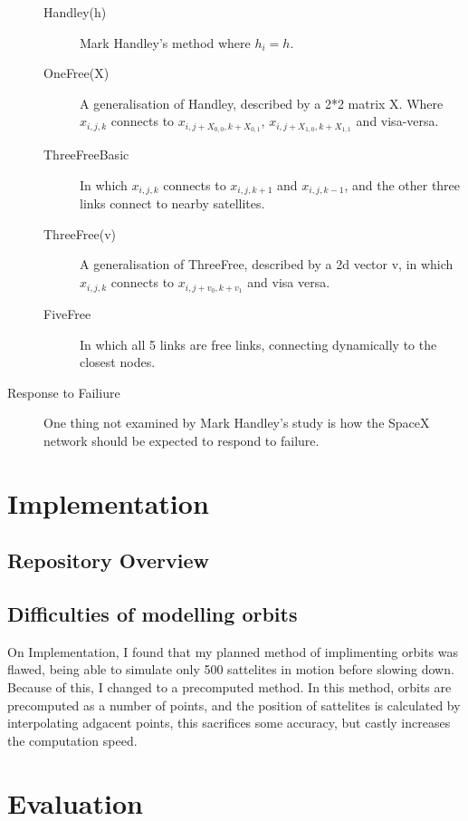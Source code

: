 \documentclass[12pt]{article}
\begin{document}
\begin{description}
\begin{description}
\item[Handley(h)] Mark Handley's method where $h_i = h$.
\item[OneFree(X)] A generalisation of Handley, described by a 2*2 matrix X. Where $x_{i,j,k}$ connects to $x_{i,j+X_{0,0},k+X_{0,1}}$, $x_{i,j+X_{1,0},k+X_{1,1}}$ and visa-versa.
\item[ThreeFreeBasic] In which $x_{i,j,k}$ connects to $x_{i,j,k+1}$ and $x_{i,j,k-1}$, and the other three links connect to nearby satellites.
\item[ThreeFree(v)] A generalisation of ThreeFree, described by a 2d vector v, in which $x_{i,j,k}$ connects to $x_{i,j+v_0,k+v_1}$ and visa versa.
\item[FiveFree] In which all 5 links are free links, connecting dynamically to the closest nodes.
\end{description}

\item[Response to Failiure]
One thing not examined by Mark Handley's study is how the SpaceX network should be expected to respond to failure.
\end{description}




\section{Implementation}

\subsection{Repository Overview}

\subsection{Difficulties of modelling orbits}
On Implementation, I found that my planned method  of implimenting orbits was flawed, being able to simulate only 500 sattelites in motion before slowing down. Because of this, I changed to a precomputed method. In this method, orbits are precomputed as a number of points, and the position of sattelites is calculated by interpolating adgacent points, this sacrifices some accuracy, but castly increases the computation speed.

\section{Evaluation}
\end{document}
